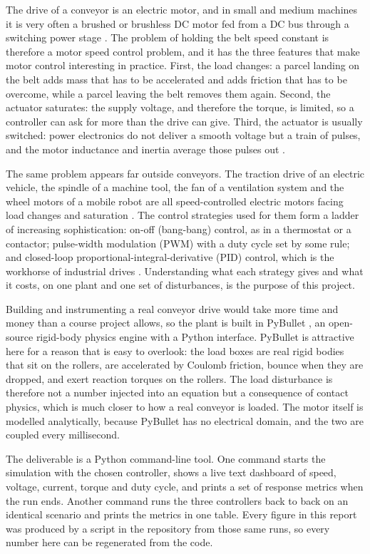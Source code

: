 \documentclass[12pt,a4paper]{article}
\begin{document}
The drive of a conveyor is an electric motor, and in small and medium machines it is very often a brushed or brushless DC motor fed from a DC bus through a switching power stage \cite{hughes}. The problem of holding the belt speed constant is therefore a motor speed control problem, and it has the three features that make motor control interesting in practice. First, the load changes: a parcel landing on the belt adds mass that has to be accelerated and adds friction that has to be overcome, while a parcel leaving the belt removes them again. Second, the actuator saturates: the supply voltage, and therefore the torque, is limited, so a controller can ask for more than the drive can give. Third, the actuator is usually switched: power electronics do not deliver a smooth voltage but a train of pulses, and the motor inductance and inertia average those pulses out \cite{mohan}.

The same problem appears far outside conveyors. The traction drive of an electric vehicle, the spindle of a machine tool, the fan of a ventilation system and the wheel motors of a mobile robot are all speed-controlled electric motors facing load changes and saturation \cite{leonhard}. The control strategies used for them form a ladder of increasing sophistication: on-off (bang-bang) control, as in a thermostat or a contactor; pulse-width modulation (PWM) with a duty cycle set by some rule; and closed-loop proportional-integral-derivative (PID) control, which is the workhorse of industrial drives \cite{astrom-hagglund}. Understanding what each strategy gives and what it costs, on one plant and one set of disturbances, is the purpose of this project.

Building and instrumenting a real conveyor drive would take more time and money than a course project allows, so the plant is built in PyBullet \cite{pybullet}, an open-source rigid-body physics engine with a Python interface. PyBullet is attractive here for a reason that is easy to overlook: the load boxes are real rigid bodies that sit on the rollers, are accelerated by Coulomb friction, bounce when they are dropped, and exert reaction torques on the rollers. The load disturbance is therefore not a number injected into an equation but a consequence of contact physics, which is much closer to how a real conveyor is loaded. The motor itself is modelled analytically, because PyBullet has no electrical domain, and the two are coupled every millisecond.

The deliverable is a Python command-line tool. One command starts the simulation with the chosen controller, shows a live text dashboard of speed, voltage, current, torque and duty cycle, and prints a set of response metrics when the run ends. Another command runs the three controllers back to back on an identical scenario and prints the metrics in one table. Every figure in this report was produced by a script in the repository from those same runs, so every number here can be regenerated from the code.
\end{document}
